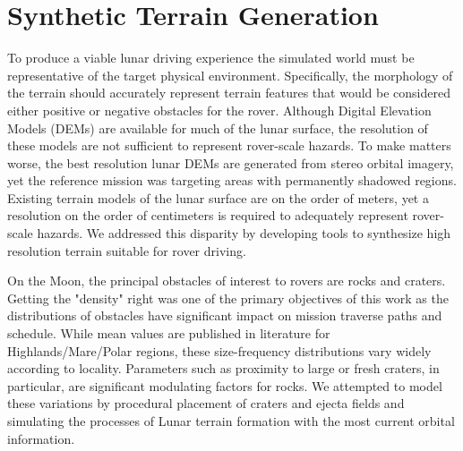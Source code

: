 \documentclass[twocolumn,letterpaper]{IEEEAerospaceCLS}  %
\begin{document}
\section{Synthetic Terrain Generation}

To produce a viable lunar driving experience the simulated world must be representative of the target physical environment. 
Specifically, the morphology of the terrain should accurately represent terrain features that would be considered either positive or negative obstacles for the rover. 
Although Digital Elevation Models (DEMs) are available for much of the lunar surface, the resolution of these models are not sufficient to represent rover-scale hazards. 
To make matters worse, the best resolution lunar DEMs are generated from stereo orbital imagery, yet the reference mission was targeting areas with permanently shadowed regions. 
Existing terrain models of the lunar surface are on the order of meters, yet a resolution on the order of centimeters is required to adequately represent rover-scale hazards. 
We addressed this disparity by developing tools to synthesize high resolution terrain suitable for rover driving. 

On the Moon, the principal obstacles of interest to rovers are rocks and craters. 
Getting the "density" right was one of the primary objectives of this work as the distributions of obstacles have significant impact on mission traverse paths and schedule. 
While mean values are published in literature \cite{Surveyor1968} for Highlands/Mare/Polar regions, these size-frequency distributions vary widely according to locality. 
Parameters such as proximity to large or fresh craters, in particular, are significant modulating factors for rocks. 
We attempted to model these variations by procedural placement of craters and ejecta fields and simulating the processes of Lunar terrain formation with the most current orbital information. 
\end{document}
